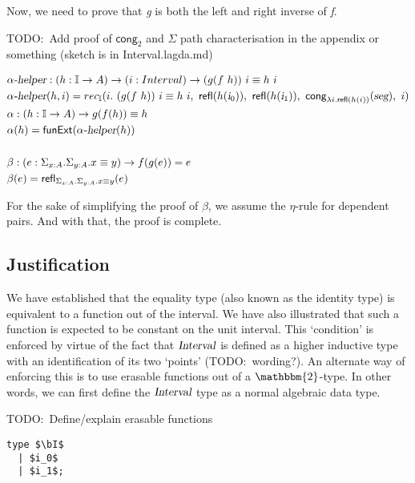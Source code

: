 \documentclass[11pt]{article}
\newcommand \kw[1] {\textsf{#1}}
\newcommand \id[1] {\textsl{#1}}
\begin{document}
Now, we need to prove that \id{g} is both the left and right inverse of \id{f}.

TODO:\ Add proof of $\kw{cong}_2$ and $\Sigma$ path characterisation in the appendix or something (sketch is in Interval.lagda.md)

\begin{align*}
  & \id{$\alpha$-helper} : (\oftype{h}{\bI \rightarrow A}) \rightarrow (\oftype{i}{Interval}) \rightarrow \eqtype{(g (f \ h)) \ i}{h \ i} \\
  & \id{$\alpha$-helper} (h , i) = rec_{\bI}(i . \ \eqtype{(g (f \ h)) \ i}{h \ i}, \ \refl{h(\ileft)}, \ \refl{h(\iright)}, \ \kw{cong}_{\lambda i . \refl{h(i)}}(\id{seg}), \ i) \\
  & \alpha : (\oftype{h}{\bI \rightarrow A}) \rightarrow \eqtype{g(f(h))}{h} \\
  & \alpha(h) =  \kw{funExt} (\id{$\alpha$-helper} (h)) \\ \\
  & \beta :  (\oftype{e}{\Sigma_{\oftype{x}{A}} . \Sigma_{\oftype{y}{A}} . \eqtype{x}{y}}) \rightarrow f(g(e)) = e \\
  & \beta(e) =  \refl{\Sigma_{\oftype{x}{A}} . \Sigma_{\oftype{y}{A}} . \eqtype{x}{y}}{e}
\end{align*}

For the sake of simplifying the proof of $\beta$, we assume the $\eta$-rule for dependent pairs. And with that, the proof is complete.

\subsection{Justification}
We have established that the equality type (also known as the identity type) is equivalent to a function out of the interval. We have also illustrated that such a function is expected to be constant on the unit interval. This `condition' is enforced by virtue of the fact that $\id{Interval}$ is defined as a higher inductive type with an identification of its two `points' (TODO:\ wording?). An alternate way of enforcing this is to use erasable functions out of a $\mathbbm{2}$-type. In other words, we can first define the $\id{Interval}$ type as a normal algebraic data type.

TODO:\ Define/explain erasable functions

\begin{lstlisting}
type $\bI$
  | $i_0$
  | $i_1$;
\end{lstlisting}
\end{document}
